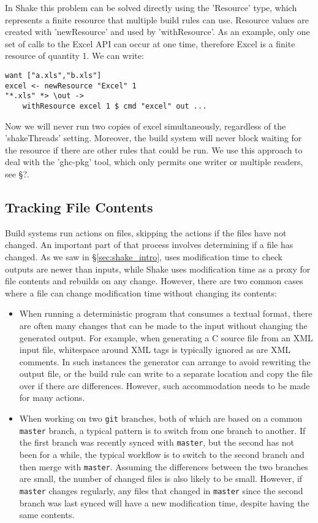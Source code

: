 In Shake this problem can be solved directly using the \lst'Resource' type, which represents a finite resource that multiple build rules can use. Resource values are created with \lst'newResource' and used by \lst'withResource'. As an example, only one set of calls to the Excel API can occur at one time, therefore Excel is a finite resource of quantity 1. We can write:

\begin{lstlisting}
want ["a.xls","b.xls"]
excel <- newResource "Excel" 1
"*.xls" *> \out ->
    withResource excel 1 $ cmd "excel" out ...
\end{lstlisting}

Now we will never run two copies of excel simultaneously, regardless of the \lst'shakeThreads' setting. Moreover, the build system will never block waiting for the resource if there are other rules that could be run. We use this approach to deal with the \lst'ghc-pkg' tool, which only permits one writer or multiple readers, see \S?.

\subsection{Tracking File Contents\label{sec:file-contents}}

Build systems run actions on files, skipping the actions if the files have not changed. An important part of that process involves determining if a file has changed. As we saw in \S\ref{sec:shake_intro}, \make{} uses modification time to check outputs are newer than inputs, while Shake uses modification time as a proxy for file contents and rebuilds on any change. However, there are two common cases where a file can change modification time without changing its contents:

\begin{itemize}
\item When running a deterministic program that consumes a textual format, there are often many changes that can be made to the input without changing the generated output. For example, when generating a C source file from an XML input file, whitespace around XML tags is typically ignored as are XML comments. In such instances the generator can arrange to avoid rewriting the output file, or the build rule can write to a separate location and copy the file over if there are differences. However, such accommodation needs to be made for many actions.
\item When working on two \texttt{git} branches, both of which are based on a common \texttt{master} branch, a typical pattern is to switch from one branch to another. If the first branch was recently synced with \texttt{master}, but the second has not been for a while, the typical workflow is to switch to the second branch and then merge with \texttt{master}. Assuming the differences between the two branches are small, the number of changed files is also likely to be small. However, if \texttt{master} changes regularly, any files that changed in \texttt{master} since the second branch was last synced will have a new modification time, despite having the same contents.
\end{itemize}

